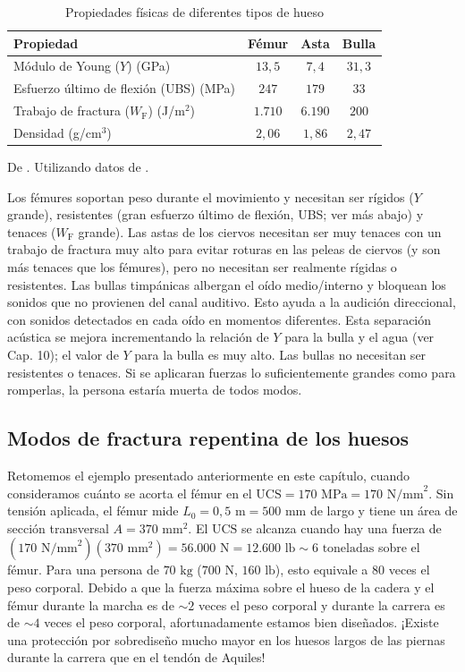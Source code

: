 \documentclass[12pt]{book}
\begin{document}
\begin{table}[htbp]
\centering
\caption{Propiedades físicas de diferentes tipos de hueso}
\label{tab:45}
\begin{tabularx}{\textwidth}{Xccc}
\toprule
\textbf{Propiedad} & \textbf{Fémur} & \textbf{Asta} & \textbf{Bulla} \\
\midrule
Módulo de Young ($Y$) (GPa) & $13,5$ & $7,4$ & $31,3$ \\
Esfuerzo último de flexión (UBS) (MPa) & $247$ & $179$ & $33$ \\
Trabajo de fractura ($W_{\text{F}}$) (J/m$^2$) & $1.710$ & $6.190$ & $200$ \\
Densidad (g/cm$^3$) & $2,06$ & $1,86$ & $2,47$ \\
\bottomrule
\end{tabularx}
\begin{flushleft}
    \small De \cite{47}. Utilizando datos de \cite{16}.
\end{flushleft}
\end{table}

Los fémures soportan peso durante el movimiento y necesitan ser rígidos ($Y$ grande), resistentes (gran esfuerzo último de flexión, UBS; ver más abajo) y tenaces ($W_{\text{F}}$ grande). Las astas de los ciervos necesitan ser muy tenaces con un trabajo de fractura muy alto para evitar roturas en las peleas de ciervos (y son más tenaces que los fémures), pero no necesitan ser realmente rígidas o resistentes. Las bullas timpánicas albergan el oído medio/interno y bloquean los sonidos que no provienen del canal auditivo. Esto ayuda a la audición direccional, con sonidos detectados en cada oído en momentos diferentes. Esta separación acústica se mejora incrementando la relación de $Y$ para la bulla y el agua (ver Cap. 10); el valor de $Y$ para la bulla es muy alto. Las bullas no necesitan ser resistentes o tenaces. Si se aplicaran fuerzas lo suficientemente grandes como para romperlas, la persona estaría muerta de todos modos.

\subsection{Modos de fractura repentina de los huesos}

Retomemos el ejemplo presentado anteriormente en este capítulo, cuando consideramos cuánto se acorta el fémur en el $\text{UCS} = 170\text{ MPa} = 170\text{ N/mm}^2$. Sin tensión aplicada, el fémur mide $L_0 = 0,5\text{ m} = 500\text{ mm}$ de largo y tiene un área de sección transversal $A = 370\text{ mm}^2$. El $\text{UCS}$ se alcanza cuando hay una fuerza de $(170\text{ N/mm}^2)(370\text{ mm}^2) = 56.000\text{ N} = 12.600\text{ lb} \sim 6\text{ toneladas}$ sobre el fémur. Para una persona de $70\text{ kg}$ ($700\text{ N}$, $160\text{ lb}$), esto equivale a $80$ veces el peso corporal. Debido a que la fuerza máxima sobre el hueso de la cadera y el fémur durante la marcha es de $\sim 2$ veces el peso corporal y durante la carrera es de $\sim 4$ veces el peso corporal, afortunadamente estamos bien diseñados. ¡Existe una protección por sobrediseño mucho mayor en los huesos largos de las piernas durante la carrera que en el tendón de Aquiles!
\end{document}
